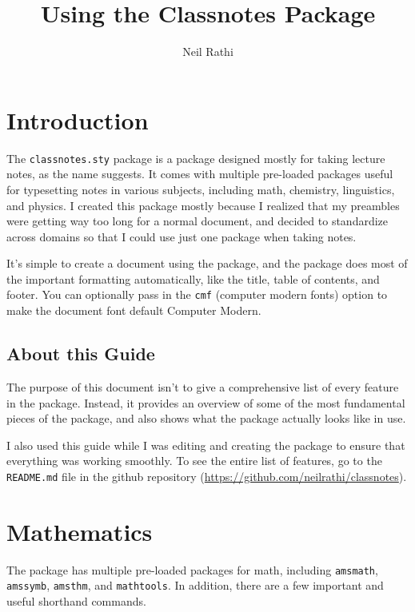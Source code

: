 \documentclass[11pt]{article}
\title{Using the Classnotes Package}
\author{Neil Rathi}
\begin{document}
\thispagestyle{empty}

\maketitle

\tableofcontents

\newpage

\section{Introduction}
The \texttt{classnotes.sty} package is a package designed mostly for taking lecture notes, as the name suggests. It comes with multiple pre-loaded packages useful for typesetting notes in various subjects, including math, chemistry, linguistics, and physics. I created this package mostly because I realized that my preambles were getting way too long for a normal document, and decided to standardize across domains so that I could use just one package when taking notes.

It's simple to create a document using the package, and the package does most of the important formatting automatically, like the title, table of contents, and footer. You can optionally pass in the \texttt{cmf} (computer modern fonts) option to make the document font default Computer Modern.

\subsection{About this Guide}
The purpose of this document isn't to give a comprehensive list of every feature in the package. Instead, it provides an overview of some of the most fundamental pieces of the package, and also shows what the package actually looks like in use.

I also used this guide while I was editing and creating the package to ensure that everything was working smoothly. To see the entire list of features, go to the \texttt{README.md} file in the github repository (\url{https://github.com/neilrathi/classnotes}).

\section{Mathematics}
The package has multiple pre-loaded packages for math, including \texttt{amsmath}, \texttt{amssymb}, \texttt{amsthm}, and \texttt{mathtools}. In addition, there are a few important and useful shorthand commands.
\end{document}
